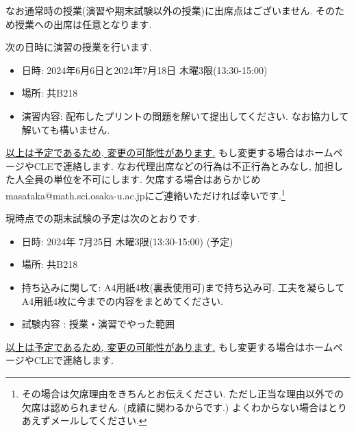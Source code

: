 \documentclass[dvipdfmx,a4paper,11pt]{article}
\theoremstyle{definition}
\begin{document}
なお通常時の授業(演習や期末試験以外の授業)に出席点はございません. そのため授業への出席は任意となります. 


\medskip
{}

次の日時に演習の授業を行います. 
\begin{itemize}
  \setlength{\parskip}{0cm} 
  \setlength{\itemsep}{0cm}
\item 日時: 2024年6月6日と2024年7月18日 木曜3限(13:30-15:00)
\item 場所: 共B218
\item 演習内容: 配布したプリントの問題を解いて提出してください. なお協力して解いても構いません. 
\end{itemize}
\underline{以上は予定であるため, 変更の可能性があります.} もし変更する場合はホームページやCLEで連絡します. 
なお代理出席などの行為は不正行為とみなし, 加担した人全員の単位を不可にします.
欠席する場合はあらかじめmasataka@math.sci.osaka-u.ac.jpにご連絡いただければ幸いです.\footnote{その場合は欠席理由をきちんとお伝えください. ただし正当な理由以外での欠席は認められません. (成績に関わるからです.) よくわからない場合はとりあえずメールしてください.}

\newpage
{}

現時点での期末試験の予定は次のとおりです. 
\begin{itemize}
  \setlength{\parskip}{0cm} 
  \setlength{\itemsep}{0cm}
\item 日時: 2024年 7月25日 木曜3限(13:30-15:00) (予定)
\item 場所: 共B218
\item 持ち込みに関して: A4用紙4枚(裏表使用可)まで持ち込み可. 工夫を凝らしてA4用紙4枚に今までの内容をまとめてください.
\item 試験内容 : 授業・演習でやった範囲
\end{itemize}
\underline{以上は予定であるため, 変更の可能性があります.} もし変更する場合はホームページやCLEで連絡します. 
\end{document}
